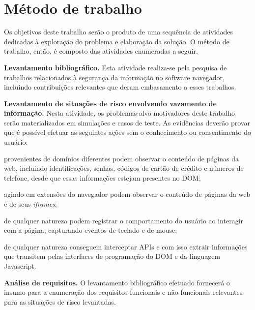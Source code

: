 \section{Método de trabalho}


Os objetivos deste trabalho serão o produto de uma sequência de atividades dedicadas à exploração do problema e elaboração da solução. O método de trabalho, então, é composto das atividades enumeradas a seguir.


\begin{alineas}
	\item \textbf{Levantamento bibliográfico.}
	Esta atividade realiza-se pela pesquisa de trabalhos relacionados à segurança da informação no software navegador, incluindo contribuições relevantes que deram embasamento a esses trabalhos.
	
	\item \textbf{Levantamento de situações de risco envolvendo vazamento de informação.}
	Nesta atividade, os problemas-alvo motivadores deste trabalho serão materializados em simulações e casos de teste. As evidências deverão provar que é possível efetuar as seguintes ações sem o conhecimento ou consentimento do usuário:
	
	\begin{alineas}
		\item \scripts provenientes de domínios diferentes podem observar o conteúdo de páginas da web, incluindo identificações, senhas, códigos de cartão de crédito e números de telefone, desde que essas informações estejam presentes no DOM;
		\item \scripts agindo em extensões do navegador podem observar o conteúdo de páginas da web e de seus \textit{iframes};
		\item \scripts de qualquer natureza podem registrar o comportamento do usuário ao interagir com a página, capturando eventos de teclado e de mouse;
		\item \scripts de qualquer natureza conseguem interceptar APIs e com isso extrair informações que transitem pelas interfaces de programação do DOM e da linguagem Javascript.
	\end{alineas}

	\item \textbf{Análise de requisitos.}
	O levantamento bibliográfico efetuado fornecerá o insumo para a enumeração dos requisitos funcionais e não-funcionais relevantes para as situações de risco levantadas.
	

\end{alineas}
